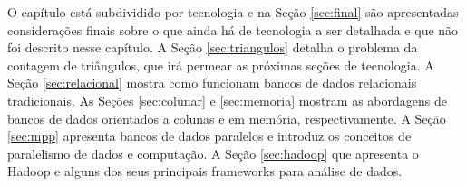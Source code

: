 O capítulo está subdividido por tecnologia e na Seção \ref{sec:final} são apresentadas considerações finais
sobre o que ainda há de tecnologia a ser detalhada e que não foi descrito nesse capítulo. A Seção \ref{sec:triangulos}
detalha o problema da contagem de triângulos, que irá permear as próximas seções de tecnologia. A Seção 
\ref{sec:relacional} mostra como funcionam bancos de dados relacionais tradicionais. As Seções 
\ref{sec:colunar} e \ref{sec:memoria} mostram as abordagens de bancos de dados orientados a colunas e 
em memória, respectivamente. A Seção \ref{sec:mpp} apresenta bancos de dados paralelos e introduz os 
conceitos de paralelismo de dados e computação. A Seção \ref{sec:hadoop} que apresenta o Hadoop e
alguns dos seus principais frameworks para análise de dados.

